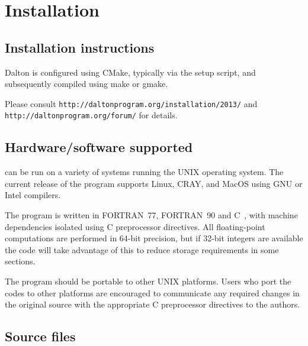 \chapter{Installation}\label{ch:install}

\section{Installation instructions}

Dalton is configured using CMake, typically via the setup script,
and subsequently compiled using make or gmake.

Please consult \verb|http://daltonprogram.org/installation/2013/|
and \verb|http://daltonprogram.org/forum/| for details.

\section{Hardware/software
supported}\label{sec:hardsoft}

{\dalton} can be run on a variety of systems running the UNIX operating system.
The current release of the program supports Linux, CRAY, and
MacOS using GNU or Intel compilers.

The program is written in FORTRAN~77,
FORTRAN~90 and C~, with machine dependencies
isolated using C preprocessor directives.  All
floating-point computations are performed in 64-bit precision, but if 32-bit
integers are available the code will take advantage of this to reduce storage
requirements in some sections.

The program should be portable to other UNIX platforms.  Users
who port the codes to other platforms are encouraged to communicate any
required changes in the original source with the appropriate C preprocessor
directives to the authors.

\section{Source files}\label{sec:source}


